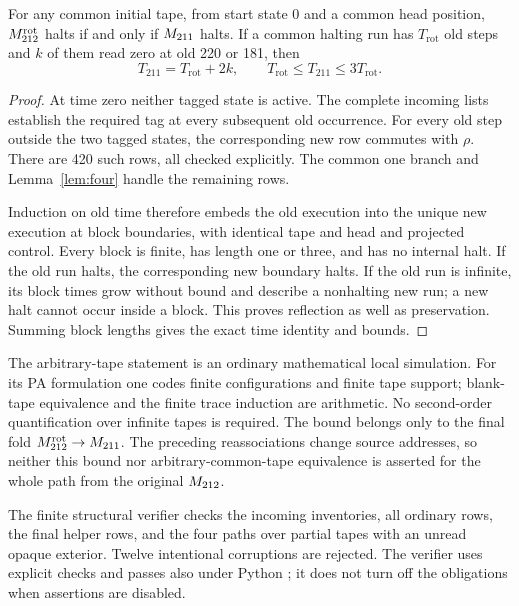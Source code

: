 \begin{theorem}\label{thm:fold}
For any common initial tape, from start state 0 and a common head position,
$M^{\mathrm{rot}}_{212}$ halts if and only if $M_{211}$ halts. If a common halting run has
$T_{\mathrm{rot}}$ old steps and $k$ of them read zero at old 220 or 181,
then
\[
 T_{211}=T_{\mathrm{rot}}+2k,\qquad
 T_{\mathrm{rot}}\leq T_{211}\leq3T_{\mathrm{rot}}.
\]
\end{theorem}
\begin{proof}
At time zero neither tagged state is active. The complete incoming lists
establish the required tag at every subsequent old occurrence. For every
old step outside the two tagged states, the corresponding new row commutes
with $\rho$. There are 420 such rows, all checked explicitly. The common
one branch and Lemma~\ref{lem:four} handle the remaining rows.

Induction on old time therefore embeds the old execution into the unique
new execution at block boundaries, with identical tape and head and
projected control. Every block is finite, has length one or three, and
has no internal halt. If the old run halts, the corresponding new boundary
halts. If the old run is infinite, its block times grow without bound and
describe a nonhalting new run; a new halt cannot occur inside a block.
This proves reflection as well as preservation. Summing block lengths
gives the exact time identity and bounds.
\end{proof}

The arbitrary-tape statement is an ordinary mathematical local simulation.
For its PA formulation one codes finite configurations and finite tape
support; blank-tape equivalence and the finite trace induction are arithmetic.
No second-order quantification over infinite tapes is required. The bound
belongs only to the final fold $M^{\mathrm{rot}}_{212}\to M_{211}$. The preceding reassociations
change source addresses, so neither this bound nor arbitrary-common-tape
equivalence is asserted for the whole path from the original $M_{212}$.

The finite structural verifier  checks the
incoming inventories, all ordinary rows, the final helper rows, and the
four paths over partial tapes with an unread opaque exterior. Twelve
intentional corruptions are rejected. The verifier uses explicit checks
and passes also under Python ; it does not turn off the obligations
when assertions are disabled.
